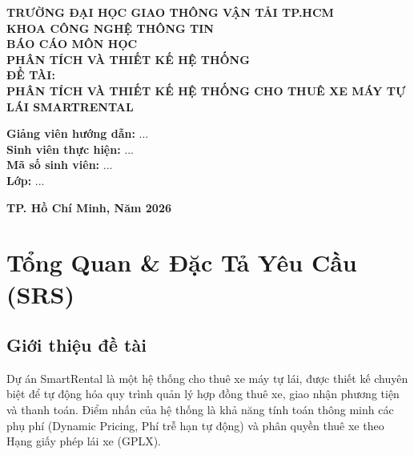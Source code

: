 \documentclass[12pt,a4paper]{report}
\begin{document}
\begin{titlepage}
    \centering
    \vspace*{2cm}
    
    {\Large \textbf{TRƯỜNG ĐẠI HỌC GIAO THÔNG VẬN TẢI TP.HCM}}\\[0.5cm]
    {\large \textbf{KHOA CÔNG NGHỆ THÔNG TIN}}\\[2cm]
    
    
    {\Huge \textbf{BÁO CÁO MÔN HỌC}}\\[0.5cm]
    {\huge \textbf{PHÂN TÍCH VÀ THIẾT KẾ HỆ THỐNG}}\\[2cm]
    
    {\Large \textbf{ĐỀ TÀI:}}\\[0.5cm]
    {\LARGE \textbf{PHÂN TÍCH VÀ THIẾT KẾ HỆ THỐNG CHO THUÊ XE MÁY TỰ LÁI SMARTRENTAL}}\\[3cm]
    
    \begin{flushright}
        \large
        \textbf{Giảng viên hướng dẫn:} ...\\
        \textbf{Sinh viên thực hiện:} ...\\
        \textbf{Mã số sinh viên:} ...\\
        \textbf{Lớp:} ...
    \end{flushright}
    
    \vfill
    
    {\large \textbf{TP. Hồ Chí Minh, Năm 2026}}
\end{titlepage}

\tableofcontents
\newpage
\listoffigures
\listoftables
\newpage

\chapter{Tổng Quan \& Đặc Tả Yêu Cầu (SRS)}

\section{Giới thiệu đề tài}
Dự án SmartRental là một hệ thống cho thuê xe máy tự lái, được thiết kế chuyên biệt để tự động hóa quy trình quản lý hợp đồng thuê xe, giao nhận phương tiện và thanh toán. Điểm nhấn của hệ thống là khả năng tính toán thông minh các phụ phí (Dynamic Pricing, Phí trễ hạn tự động) và phân quyền thuê xe theo Hạng giấy phép lái xe (GPLX).
\end{document}
